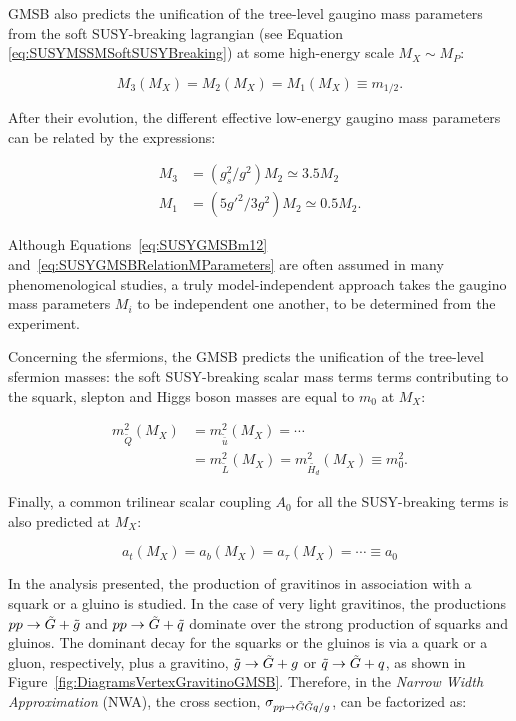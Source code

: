 GMSB also predicts the unification of the tree-level gaugino mass parameters from the soft SUSY-breaking lagrangian (see Equation \ref{eq:SUSYMSSMSoftSUSYBreaking}) at some high-energy scale $M_X \sim M_P$:

\begin{equation}
M_3(M_X) = M_2(M_X) = M_1(M_X) \equiv m_{1/2}.
\label{eq:SUSYGMSBm12}
\end{equation}

After their evolution, the different effective low-energy gaugino mass parameters can be related by the expressions:

\begin{equation}
\begin{split}
M_3 &= (g_s^2 / g^2) M_2 \simeq 3.5 M_2 \\
M_1 &= (5g'^2 / 3g^2) M_2 \simeq 0.5 M_2.
\end{split}
\label{eq:SUSYGMSBRelationMParameters}
\end{equation}

Although Equations~\ref{eq:SUSYGMSBm12} and~\ref{eq:SUSYGMSBRelationMParameters} are often assumed in many phenomenological studies, a truly model-independent approach takes the gaugino mass parameters $M_i$ to be independent one another, to be determined from the experiment.

Concerning the sfermions, the GMSB predicts the unification of the tree-level sfermion masses: the soft SUSY-breaking scalar mass terms terms contributing to the squark, slepton and Higgs boson masses are equal to $m_0$ at $M_X$:

\begin{equation}
\begin{split}
m_{\tilde{Q}}^2(M_X) &= m_{\tilde{\bar{u}}}^2(M_X) = \cdots \\
& = m_{\tilde{L}}^2(M_X) = m_{\tilde{H_d}}^2(M_X) \equiv m_0^2.
\end{split}
\label{eq:SUSYGMSBm0}
\end{equation}

Finally, a common trilinear scalar coupling $A_0$ for all the SUSY-breaking terms is also predicted at $M_X$:

\begin{equation}
a_t(M_X) = a_b(M_X) = a_\tau(M_X) = \cdots \equiv a_0
\label{SUSYGMSBTrilinearCouplings}
\end{equation}

In the analysis presented, the production of gravitinos in association with a squark or a gluino is studied.
In the case of very light gravitinos, the productions $pp \rightarrow \tilde{G} + \tilde{g}$ and $pp \rightarrow \tilde{G} + \tilde{q}$ dominate over the strong production of squarks and gluinos.
The dominant decay for the squarks or the gluinos is via a quark or a gluon, respectively, plus a gravitino, $\tilde{g} \rightarrow \tilde{G} + g$ or $\tilde{q} \rightarrow \tilde{G} + q$, as shown in Figure~\ref{fig:DiagramsVertexGravitinoGMSB}.
Therefore, in the \emph{Narrow Width Approximation} (NWA), the cross section, $\sigma_{pp \rightarrow \tilde{G} \tilde{G} q/g}$, can be factorized as:

